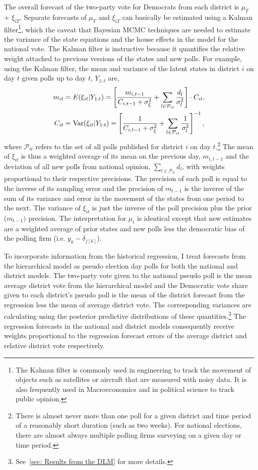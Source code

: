 \documentclass[12pt,final,fleqn]{article}
\theoremstyle{plain}
\newcommand\var{{\rm Var}}
\begin{document}
The overall forecast of the two-party vote for Democrats from each district is $\mu_T$ + $\xi_{iT}$. Separate forecasts of $\mu_T$ and $\xi_{iT}$ can basically be estimated using a Kalman filter\footnote{The Kalman filter is commonly used in engineering to track the movement of objects such as satellites or aircraft that are measured with noisy data. It is also frequently used in Macroeconomics and in political science to track public opinion.}, which the caveat that Bayesian MCMC techniques are needed to estimate the variance of the state equations and the house effects in the model for the national vote. The Kalman filter is instructive because it quantifies the relative weight attached to previous versions of the states and new polls. For example, using the Kalman filter, the mean and variance of the latent states in district $i$ on day $t$ given polls up to day $t$, $Y_{1:t}$ are,
\begin{align}
m_{it} &= E(\xi_{it}|Y_{1:t})= \left[\frac{m_{i,t-1}}{C_{i,t-1} + \sigma_\xi^2} + \sum_{l \in \mathcal{P}_{it}} \frac{d_{l}}{\sigma^2_l}\right]\cdot C_{it},\\
C_{it} &= \var(\xi_{it}|Y_{1:t})= \left[\frac{1}{C_{i,t-1} + \sigma_\xi^2}+ \sum_{l \in \mathcal{P}_{it}}\frac{1}{\sigma^2_{l}}\right]^{-1},
\end{align}
where $\mathcal{P}_{it}$ refers to the set of all polls published for district $i$ on day $t$.\footnote{There is almost never more than one poll for a given district and time period of a reasonably short duration (such as two weeks). For national elections, there are almost always multiple polling firms surveying on a given day or time period.}
The mean of $\xi_{it}$ is thus a weighted average of its mean on the previous day, $m_{i,t-1}$ and the deviation of all new polls from national opinion, $\sum_{l \in \mathcal{P}_{it}} d_{l}$, with weights proportional to their respective precisions. The precision of each poll is equal to the inverse of its sampling error and the precision of $m_{t-1}$ is the inverse of the sum of its variance and error in the movement of the states from one period to the next. The variance of $\xi_{it}$ is just the inverse of the poll precision plus the prior ($m_{t-1})$ precision. The interpretation for $\mu_t$ is identical except that new estimates are a weighted average of prior states and new polls less the democratic bias of the polling firm (i.e. $y_{k} - \delta_{j[k]}$).

To incorporate information from the historical regression, I treat forecasts from the hierarchical model as pseudo election day polls for both the national and district models. The two-party vote given to the national pseudo poll is the mean average district vote from the hierarchical model and the Democratic vote share given to each district's pseudo poll is the mean of the district forecast from the regression less the mean of average district vote. The corresponding variances are calculating using the posterior predictive distributions of these quantities.\footnote{See~\autoref{sec: Results from the DLM} for more details.} The regression forecasts in the national and district models consequently receive weights proportional to the regression forecast errors of the average district and relative district vote respectively. 
\end{document}

